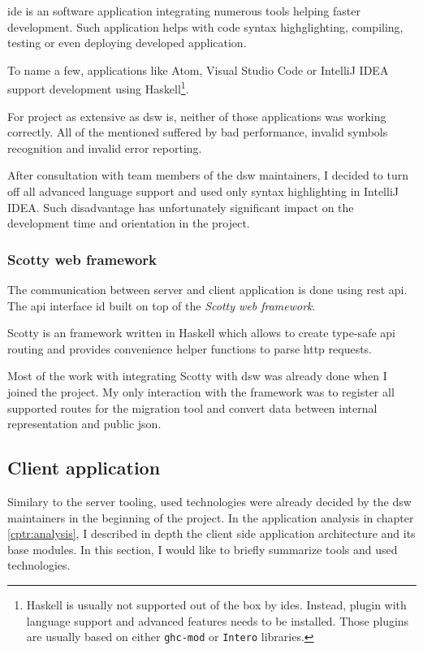 \gls{ide} is an software application integrating numerous tools helping faster development\cite{ssq-ide}.
Such application helps with code syntax highglighting, compiling, testing or even deploying developed application.

To name a few, applications like Atom, Visual Studio Code or IntelliJ IDEA support development using Haskell\footnote{Haskell is usually not supported out of the box by \gls{ide}s. Instead, plugin with language support and advanced features needs to be installed. Those plugins are usually based on either \texttt{ghc-mod} or \texttt{Intero} libraries.}.

For project as extensive as \gls{dsw} is, neither of those applications was working correctly.
All of the mentioned suffered by bad performance, invalid symbols recognition and invalid error reporting.

After consultation with team members of the \gls{dsw} maintainers, I decided to turn off all advanced language support and used only syntax highlighting in IntelliJ IDEA.
Such disadvantage has unfortunately significant impact on the development time and orientation in the project.

\subsubsection*{Scotty web framework}

The communication between server and client application is done using \gls{rest} \gls{api}.
The \gls{api} interface id built on top of the \textit{Scotty web framework}.

Scotty is an framework written in Haskell which allows to create type-safe \gls{api} routing and provides convenience helper functions to parse \gls{http} requests.

Most of the work with integrating Scotty with \gls{dsw} was already done when I joined the project.
My only interaction with the framework was to register all supported routes for the migration tool and convert data between internal representation and public \gls{json}.

\subsection{Client application}

Similary to the server tooling, used technologies were already decided by the \gls{dsw} maintainers in the beginning of the project.
In the application analysis in chapter \ref{cptr:analysis}, I described in depth the client side application architecture and its base modules.
In this section, I would like to briefly summarize tools and used technologies.

